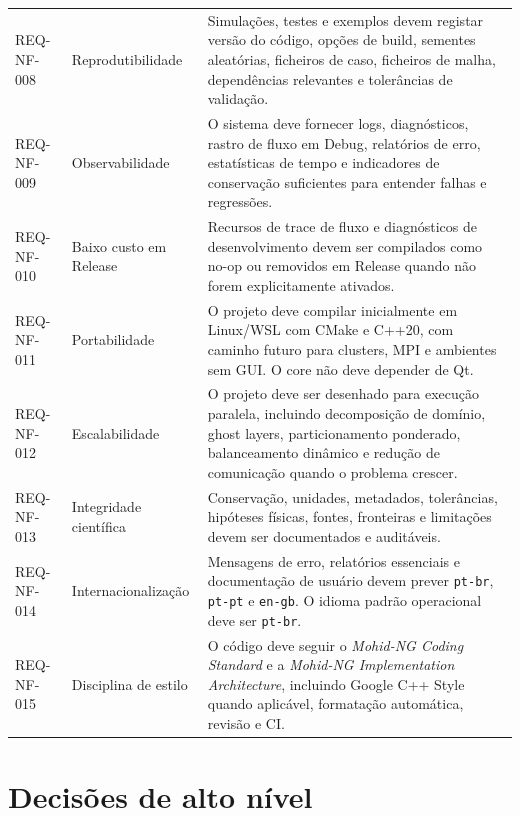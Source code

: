 \documentclass[11pt,a4paper]{article}
\begin{document}
\begin{longtable}{p{}p{}p{}}
\addlinespace
REQ-NF-008 & Reprodutibilidade & Simula\c{c}\~oes, testes e exemplos devem registar vers\~ao do c\'odigo, op\c{c}\~oes de build, sementes aleat\'orias, ficheiros de caso, ficheiros de malha, depend\^encias relevantes e toler\^ancias de valida\c{c}\~ao.\tabularnewline
\addlinespace
REQ-NF-009 & Observabilidade & O sistema deve fornecer logs, diagn\'osticos, rastro de fluxo em Debug, relat\'orios de erro, estat\'isticas de tempo e indicadores de conserva\c{c}\~ao suficientes para entender falhas e regress\~oes.\tabularnewline
\addlinespace
REQ-NF-010 & Baixo custo em Release & Recursos de trace de fluxo e diagn\'osticos de desenvolvimento devem ser compilados como no-op ou removidos em Release quando n\~ao forem explicitamente ativados.\tabularnewline
\addlinespace
REQ-NF-011 & Portabilidade & O projeto deve compilar inicialmente em Linux/WSL com CMake e C++20, com caminho futuro para clusters, MPI e ambientes sem GUI. O core n\~ao deve depender de Qt.\tabularnewline
\addlinespace
REQ-NF-012 & Escalabilidade & O projeto deve ser desenhado para execu\c{c}\~ao paralela, incluindo decomposi\c{c}\~ao de dom\'inio, ghost layers, particionamento ponderado, balanceamento din\^amico e redu\c{c}\~ao de comunica\c{c}\~ao quando o problema crescer.\tabularnewline
\addlinespace
REQ-NF-013 & Integridade cient\'ifica & Conserva\c{c}\~ao, unidades, metadados, toler\^ancias, hip\'oteses f\'isicas, fontes, fronteiras e limita\c{c}\~oes devem ser documentados e audit\'aveis.\tabularnewline
\addlinespace
REQ-NF-014 & Internacionaliza\c{c}\~ao & Mensagens de erro, relat\'orios essenciais e documenta\c{c}\~ao de usu\'ario devem prever \texttt{pt-br}, \texttt{pt-pt} e \texttt{en-gb}. O idioma padr\~ao operacional deve ser \texttt{pt-br}.\tabularnewline
\addlinespace
REQ-NF-015 & Disciplina de estilo & O c\'odigo deve seguir o \emph{Mohid-NG Coding Standard} e a \emph{Mohid-NG Implementation Architecture}, incluindo Google C++ Style quando aplic\'avel, formata\c{c}\~ao autom\'atica, revis\~ao e CI.\tabularnewline
\bottomrule
\end{longtable}


\section{Decis\~oes de alto n\'ivel}
\end{document}
